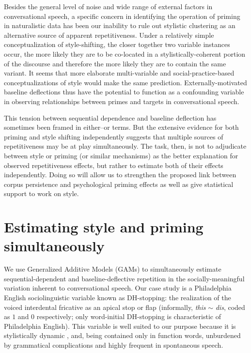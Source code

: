 \documentclass[12pt]{article}
\begin{document}
Besides the general level of noise and wide range of external factors in conversational speech, a specific concern in identifying the operation of priming in naturalistic data has been our inability to rule out stylistic clustering as an alternative source of apparent repetitiveness. Under a relatively simple conceptualization of style-shifting, the closer together two variable instances occur, the more likely they are to be co-located in a stylistically-coherent portion of the discourse and therefore the more likely they are to contain the same variant. It seems that more elaborate multi-variable and social-practice-based conceptualizations of style would make the same prediction. Externally-motivated baseline deflections thus have the potential to function as a confounding variable in observing relationships between primes and targets in conversational speech.

This tension between sequential dependence and baseline deflection has sometimes been framed in either--or terms. But the extensive evidence for both priming and style shifting independently suggests that multiple sources of repetitiveness may be at play simultaneously. The task, then, is not to adjudicate between style or priming (or similar mechanisms) as the better explanation for observed repetitiveness effects, but rather to estimate both of their effects independently.  
Doing so will allow us to strengthen the proposed link between corpus persistence and psychological priming effects as well as give statistical support to work on style.



\section{Estimating style and priming simultaneously}

We use Generalized Additive Models (GAMs) to simultaneously estimate sequential-dependent and baseline-deflective repetition in the socially-meaningful variation inherent to conversational speech. Our case study is a Philadelphia English sociolinguistic variable known as DH-stopping: the realization of the voiced interdental fricative as an apical stop or flap (informally, \emph{this} $\sim$ \emph{dis}, coded as $1$ and $0$ respectively; only word-initial DH-stopping is characteristic of Philadelphia English).  This variable is well suited to our purpose because it is stylistically dynamic \citep{Labov:2001}, and, being contained only in function words, unburdened by grammatical complications and highly  frequent in spontaneous speech. 
\end{document}

